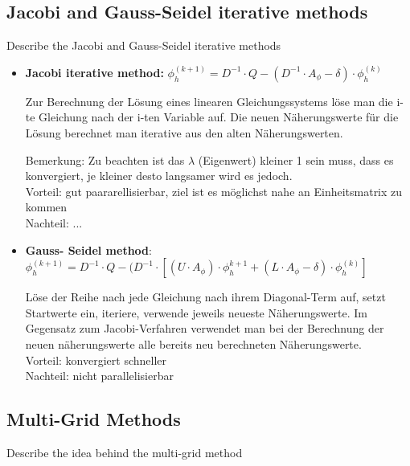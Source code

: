 \documentclass[a4paper]{scrartcl}
\begin{document}
\subsection{Jacobi and Gauss-Seidel iterative methods}
Describe the Jacobi and Gauss-Seidel iterative methods
\begin{itemize}
\item \textbf{Jacobi iterative method:}  $ \phi ^{(k+1)}_h = D^{-1} \cdot Q - (D^{-1} \cdot A_\phi - \delta)\cdot \phi_h^{(k)}$

Zur Berechnung der Lösung eines linearen Gleichungssystems löse man die i-te Gleichung nach der i-ten Variable auf. Die neuen Näherungswerte für die Lösung berechnet man iterative aus den alten Näherungswerten.

Bemerkung: Zu beachten ist das $\lambda$ (Eigenwert) kleiner 1 sein muss, dass es konvergiert, je kleiner desto langsamer wird es jedoch.\\
Vorteil: gut paararellisierbar, ziel ist es möglichst nahe an Einheitsmatrix zu kommen\\
Nachteil: ...\\


\item \textbf{Gauss- Seidel method}: $ \phi ^{(k+1)}_h = D^{-1} \cdot Q - (D^{-1} \cdot [(U\cdot A_\phi ) \cdot \phi_h^{k+1} + (L \cdot A_\phi - \delta)\cdot \phi_h^{(k)}]$

Löse der Reihe nach jede Gleichung nach ihrem Diagonal-Term auf, setzt Startwerte ein, iteriere, verwende jeweils neueste Näherungswerte. Im Gegensatz zum Jacobi-Verfahren verwendet man bei der Berechnung der neuen näherungswerte alle bereits neu berechneten Näherungswerte.\\

Vorteil: konvergiert schneller\\
Nachteil: nicht parallelisierbar\\

\end{itemize} 

\subsection{Multi-Grid Methods} 
Describe the idea behind the multi-grid method
\end{document}
